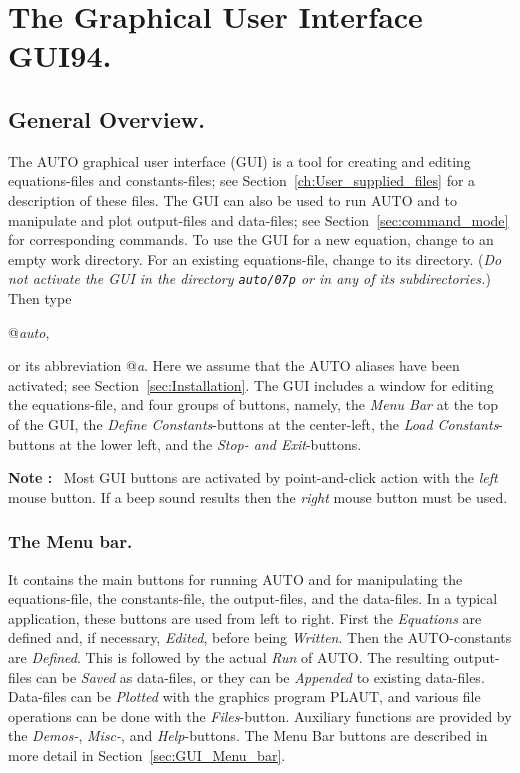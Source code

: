 \documentclass[12pt]{report}
\begin{document}
\chapter{ The Graphical User Interface GUI94.} \label{ch:GUI}
\section{ General Overview.} \label{sec:GUI_Overview}
The {\cal AUTO} graphical user interface (GUI) is a tool
for creating and editing equations-files and constants-files;
see Section~\ref{ch:User_supplied_files}
 for a description of these files.
The GUI can also be used to run {\cal AUTO} and to manipulate and plot
output-files and data-files; 
see Section~\ref{sec:command_mode} for corresponding commands.
To use the GUI for a new equation, change to an empty work directory.
For an existing equations-file, change to its directory.
({\it Do not activate the GUI in the directory {\tt auto/07p} 
or in any of its subdirectories.})
Then type 

\centerline { @{\it auto}, }

or its abbreviation @{\it a}.
Here we assume that the {\cal AUTO} aliases have been activated; 
see Section~\ref{sec:Installation}.
The GUI includes a window for editing the equations-file,
and four groups of buttons, namely,
the {\it Menu Bar} at the top of the GUI,
the {\it Define Constants}-buttons at the center-left,
the {\it Load Constants}-buttons at the lower left,
and the {\it Stop- and Exit}-buttons.

{\bf Note :}~
Most GUI buttons are activated by point-and-click action with 
the {\it left} mouse button. 
If a beep sound results then the {\it right} mouse button must be used. 

\subsection{ The Menu bar.}
It contains the main buttons for running {\cal AUTO}
and for manipulating the equations-file, the constants-file,
the output-files, and the data-files.
In a typical application, these buttons are used from left to right.
First the {\it Equations} are defined and, if necessary, {\it Edited},
before being {\it Written}.
Then the {\cal AUTO}-constants are {\it Defined}.
This is followed by the actual {\it Run} of {\cal AUTO}.
The resulting output-files can be {\it Saved} as data-files,
or they can be {\it Appended} to existing data-files.
Data-files can be {\it Plotted} with the graphics program {\cal PLAUT},
and various file operations can be done with the {\it Files}-button.
Auxiliary functions are provided by the {\it Demos-}, {\it Misc-},
and {\it Help}-buttons.
The Menu Bar buttons are described in more detail 
in Section~\ref{sec:GUI_Menu_bar}.
\end{document}
